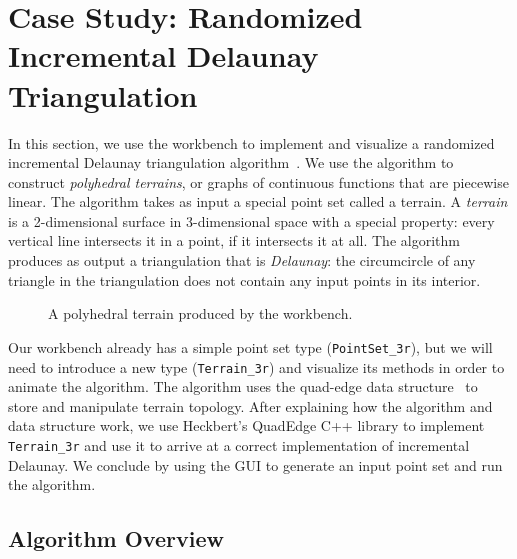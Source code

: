 
\FloatBarrier
\section{Case Study: Randomized Incremental Delaunay Triangulation}
\label{sec:case-delaunay}

In this section, we use the workbench to implement and visualize a randomized
incremental Delaunay triangulation algorithm~\cite{lischinski1994incremental}.
We use the algorithm to construct \emph{polyhedral terrains}, or graphs of
continuous functions that are piecewise linear. The algorithm takes as input a
special point set called a terrain. A \emph{terrain} is a 2-dimensional surface
in 3-dimensional space with a special property: every vertical line intersects
it in a point, if it intersects it at all. The algorithm produces as output a
triangulation that is \emph{Delaunay}: the circumcircle of any triangle in the
triangulation does not contain any input points in its interior. 

\begin{figure}[htb]
\centering
{} 
\caption{A polyhedral terrain produced by the workbench.}
\label{fig:terrain-intro} 
\end{figure}

Our workbench already has a simple point set type
(\texttt{PointSet\_3r}), but we will need to introduce a new type 
(\texttt{Terrain\_3r}) and visualize its methods in order to animate the
algorithm. The algorithm uses the quad-edge data
structure~\cite{guibas1985primitives} to store and manipulate terrain topology.
After explaining how the algorithm and data structure work, we use Heckbert's
QuadEdge C++ library to implement \texttt{Terrain\_3r} and use it to arrive at a
correct implementation of incremental Delaunay. We conclude by using the GUI to
generate an input point set and run the algorithm.


\subsection{Algorithm Overview}

